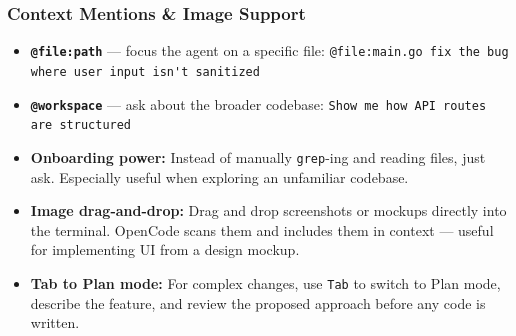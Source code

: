 \begin{frame}[fragile]\frametitle{Context Mentions \& Image Support}
  \begin{itemize}
    \item \textbf{\texttt{@file:path}} --- focus the agent on a specific file:
      \lstinline|@file:main.go fix the bug where user input isn't sanitized|
    \item \textbf{\texttt{@workspace}} --- ask about the broader codebase:
      \lstinline|Show me how API routes are structured|
    \item \textbf{Onboarding power:} Instead of manually \texttt{grep}-ing and reading files, just ask. Especially useful when exploring an unfamiliar codebase.
    \item \textbf{Image drag-and-drop:} Drag and drop screenshots or mockups directly into the terminal. OpenCode scans them and includes them in context --- useful for implementing UI from a design mockup.
    \item \textbf{Tab to Plan mode:} For complex changes, use \texttt{Tab} to switch to Plan mode, describe the feature, and review the proposed approach before any code is written.
  \end{itemize}

\end{frame}


